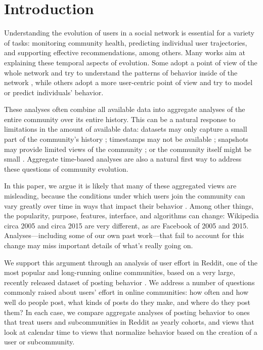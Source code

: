 
\section{Introduction}

Understanding the evolution of users in a social network is essential for a variety of tasks: monitoring community health, predicting individual user trajectories, and supporting effective recommendations, among others.  Many works aim at explaining these temporal aspects of evolution. Some adopt a point of view of the whole network and try to understand the patterns of behavior inside of the network \cite{Zhu2014, Kooti2010}, while others adopt a more user-centric point of view and try to model \cite{Correa2010, Priedhorsky2007, Panciera2009, Welser2011a} or predict \cite{Danescu-niculescu-mizil2013} individuals' behavior.

These analyses often combine all available data into aggregate analyses of the entire community over its entire history.  This can be a natural response to limitations in the amount of available data: datasets may only capture a small part of the community's history \cite{}; timestamps may not be available \cite{}; snapshots may provide limited views of the community \cite{}; or the community itself might be small \cite{Lewis2008}.  Aggregate time-based analyses are also a natural first way to address these questions of community evolution.

In this paper, we argue it is likely that many of these aggregated views are misleading, because the conditions under which users join the community can vary greatly over time in ways that impact their behavior \cite{Miller2015}.  Among other things, the popularity, purpose, features, interface, and algorithms can change: Wikipedia circa 2005 and circa 2015 are very different, as are Facebook of 2005 and 2015.  Analyses---including some of our own past work---that fail to account for this change may miss important details of what's really going on.

We support this argument through an analysis of user effort in Reddit, one of the most popular and long-running online communities, based on a very large, recently released dataset of posting behavior \cite{}.  We address a number of questions commonly raised about users' effort in online communities: how often and how well do people post, what kinds of posts do they make, and where do they post them?  In each case, we compare aggregate analyses of posting behavior to ones that treat users and subcommunities in Reddit as yearly cohorts, and views that look at calendar time to views that normalize behavior based on the creation of a user or subcommunity.


